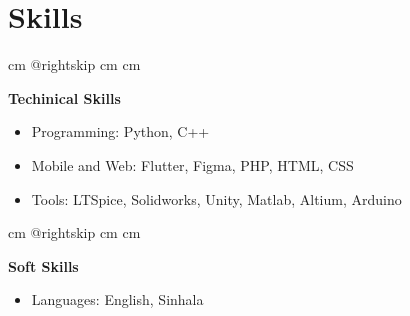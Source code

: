 \documentclass[10pt, a4paper]{article}
\newenvironment{highlights}{
        \begin{itemize}[
                topsep=0pt,
                parsep=0.10 cm,
                partopsep=0pt,
                itemsep=0pt,
                after=\vspace{-1\baselineskip},
                leftmargin=0.4 cm + 3pt
            ]
    }{
        \end{itemize}
    } %
\let\hrefWithoutArrow\href
\renewcommand{\href}[2]{\hrefWithoutArrow{#1}{\mbox{\ifthenelse{\equal{#2}{}}{ }{#2 }\raisebox{.15ex}{\footnotesize \faExternalLink*}}}}
\let\originalTabularx\tabularx
\let\originalEndTabularx\endtabularx
\renewenvironment{tabularx}{\bgroup\centering\originalTabularx}{\originalEndTabularx\par\egroup}
\begin{document}
%
%
%
%
%

\vspace{0.2 cm}
 \section{Skills}

        \begingroup{} cm
        \advance\csname @rightskip cm
        \advance{} cm

        \textbf{Techinical Skills} 
        \begin{highlights}
        \item Programming: Python, C++
        \item Mobile and Web: Flutter, Figma, PHP, HTML, CSS%
        \item Tools: LTSpice, Solidworks, Unity, Matlab, Altium, Arduino  %
        \end{highlights}
        \par\endgroup

        \vspace{0.6 cm}
        \begingroup{} cm
        \advance\csname @rightskip cm
        \advance{} cm

        \textbf{Soft Skills}  \begin{highlights}
        \item Languages: English, Sinhala \end{highlights}
        \par\endgroup
    
    \vspace{0.4 cm}
    
\end{document}
